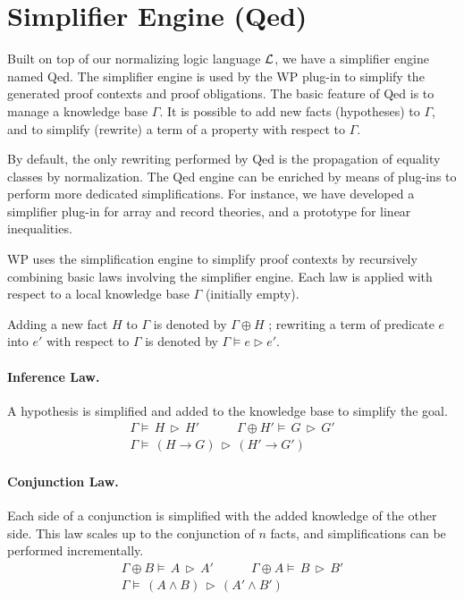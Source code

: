\section{Simplifier Engine (Qed)}

Built on top of our normalizing logic language $\cal{L}$, we have a
simplifier engine named \textsf{Qed}\cite{qed}. The simplifier engine is used by
the \textsf{WP} plug-in to simplify the generated proof contexts and proof
obligations. The basic feature of \textsf{Qed} is to manage a knowledge
base $\Gamma$. It is possible to add new facts (hypotheses) to
$\Gamma$, and to simplify (rewrite) a term of a property with respect
to $\Gamma$.

By default, the only rewriting performed by \textsf{Qed} is the
propagation of equality classes by normalization. The \textsf{Qed}
engine can be enriched by means of plug-ins to perform more dedicated
simplifications. For instance, we have developed a simplifier plug-in
for array and record theories, and a prototype for linear inequalities.

\textsf{WP} uses the simplification engine to simplify proof contexts
by recursively combining basic laws involving the simplifier
engine. Each law is applied with respect to a local knowledge base
$\Gamma$ (initially empty).

\newcommand{\QED}[3]{#1\models\,#2\,\triangleright\,#3}
\newcommand{\LAW}[2]{\begin{array}{c}{#1}\\\hline{#2}\end{array}}
\newcommand{\AND}{\quad\quad\quad}

Adding a new fact $H$ to $\Gamma$ is denoted by $\Gamma\oplus H$ ;
rewriting a term of predicate $e$ into $e'$ with respect to $\Gamma$
is denoted by $\Gamma\models e\triangleright e'$.

\paragraph{Inference Law.}
A hypothesis is simplified and added to the knowledge base to
simplify the goal.
\[\LAW%
 {\QED{\Gamma}{H}{H'}\AND\QED{\Gamma\oplus H'}{G}{G'}}%
 {\QED{\Gamma}{(H\rightarrow G)}{(H'\rightarrow G')}}
\]

\paragraph{Conjunction Law.}
Each side of a conjunction is simplified with the added knowledge of
the other side. This law scales up to the conjunction of $n$ facts,
and simplifications can be performed incrementally.
\[\LAW%
 {\QED{\Gamma\oplus B}{A}{A'}\AND\QED{\Gamma\oplus A}{B}{B'}}%
 {\QED{\Gamma}{(A\wedge B)}{(A'\wedge B')}}
\]

